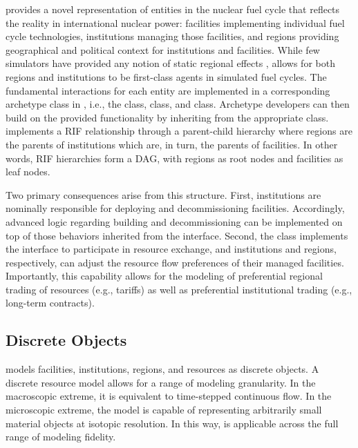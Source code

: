 \Cyclus provides a novel representation of entities in the nuclear fuel cycle
that reflects the reality in international nuclear power: facilities implementing individual fuel cycle technologies, institutions managing those facilities, and regions providing geographical and political context for institutions and facilities. While
few simulators have provided any notion of static regional
effects \cite{huff_next_2010,juchau_modeling_2010}, \Cyclus allows for both regions and institutions to be first-class
agents in simulated fuel cycles. The fundamental interactions for each entity are implemented in a corresponding
archetype class in \Cyclus, i.e., the  class, 
class, and  class. Archetype developers can then build on the
provided functionality by inheriting from the appropriate class.
\Cyclus implements a \gls{RIF} relationship through a
parent-child hierarchy where
regions are the parents of institutions which are, in turn, the parents of
facilities. In other words, \gls{RIF} hierarchies form a \gls{DAG},
with regions as root nodes and facilities as leaf nodes.

Two primary consequences arise from this structure. First, institutions are
nominally responsible for deploying and decommissioning facilities. Accordingly, advanced
logic regarding building and decommissioning can be implemented on top of
those behaviors inherited from the
 interface. Second, the  class implements the
 interface to participate in resource exchange, and institutions and regions, respectively, can
adjust the resource flow preferences of their managed facilities. Importantly,
this capability allows for the modeling of preferential regional trading
of resources (e.g., tariffs) as well as preferential institutional trading
(e.g., long-term contracts).

\subsection{Discrete Objects}

\Cyclus models facilities, institutions, regions, and resources as discrete
objects. A discrete resource model allows for a range of modeling granularity. In the
macroscopic extreme, it is equivalent to time-stepped continuous flow. In the
microscopic extreme, the model is capable of representing arbitrarily small
material objects at isotopic resolution. In this way, \Cyclus is
applicable across the full range of modeling fidelity.

